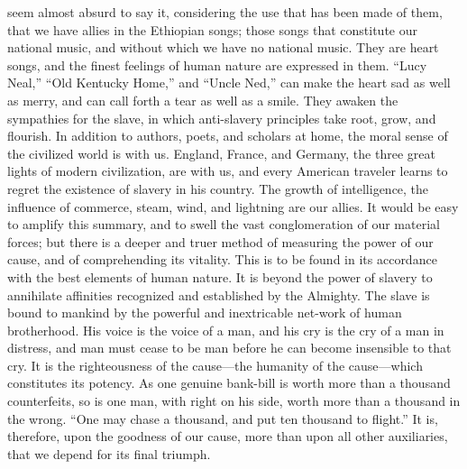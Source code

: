 seem almost absurd to say it, considering the use that has been made of
them, that we have allies in the Ethiopian songs; those songs that
constitute our national music, and without which we have no national
music. They are heart songs, and the finest feelings of human nature are
expressed in them. ``Lucy Neal,'' ``Old Kentucky Home,'' and ``Uncle
Ned,'' can make the heart sad as well as merry, and can call forth a
tear as well as a smile. They awaken the sympathies for the slave, in
which anti-slavery principles take root, grow, and flourish. In addition
to authors, poets, and scholars at home, the moral sense of the
civilized world is with us. England, France, and Germany, the three
great lights of modern civilization, are with us, and every American
traveler learns to regret the existence of slavery in his country. The
growth of intelligence, the influence of commerce, steam, wind, and
lightning are our allies. It would be easy to amplify this summary, and
to swell the vast conglomeration of our material forces; but there is a
deeper and truer method of measuring the power of our cause, and of
comprehending its vitality. This is to be found in its accordance with
the best elements of human nature. It is beyond the power of slavery to
annihilate affinities recognized and established by the Almighty. The
slave is bound to mankind by the powerful and inextricable net-work of
human brotherhood. His {\protect\hypertarget{463}{}{}}voice is the voice
of a man, and his cry is the cry of a man in distress, and man must
cease to be man before he can become insensible to that cry. It is the
righteousness of the cause---the humanity of the cause---which
constitutes its potency. As one genuine bank-bill is worth more than a
thousand counterfeits, so is one man, with right on his side, worth more
than a thousand in the wrong. ``One may chase a thousand, and put ten
thousand to flight.'' It is, therefore, upon the goodness of our cause,
more than upon all other auxiliaries, that we depend for its final
triumph.

